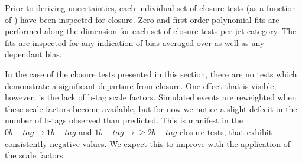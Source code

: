 Prior to deriving uncertainties, each individual set of closure tests
(as a function of \scalht) have been inspected for closure. Zero and first order
polynomial fits are performed along the \scalht dimension for each set
of closure tests per jet category. The fits are inspected for any
indication of bias averaged over \scalht as well as any
\scalht-dependant bias.

In the case of the closure tests presented in this section, there are
no tests which demonstrate a significant departure from closure. One
effect that is visible, however, is the lack of b-tag scale factors.
Simulated events are reweighted when these scale factors become
available, but for now we notice a slight defecit in the number of
b-tags observed than predicted. This is manifest in the $0 b-tag
\rightarrow 1 b-tag$ and $1 b-tag \rightarrow \geq 2 b-tag$ closure
tests, that exhibit consistently negative values. We expect this to
improve with the application of the scale factors. 




